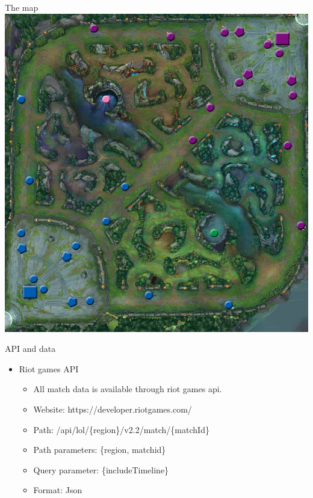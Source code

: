 \begin{frame}{The map}
\centering
\includegraphics[scale=0.2]{img/kent/lolmap.jpg}
\end{frame}
\begin{frame}{API and data}
\begin{itemize}
\item Riot games API
\begin{itemize}
\item All match data is available through riot games api.
\item Website: https://developer.riotgames.com/
\item Path: /api/lol/\{region\}/v2.2/match/\{matchId\}
\item Path parameters: \{region, matchid\}
\item Query parameter: \{includeTimeline\}
\item Format: Json
\end{itemize}
\end{itemize}
\end{frame}
